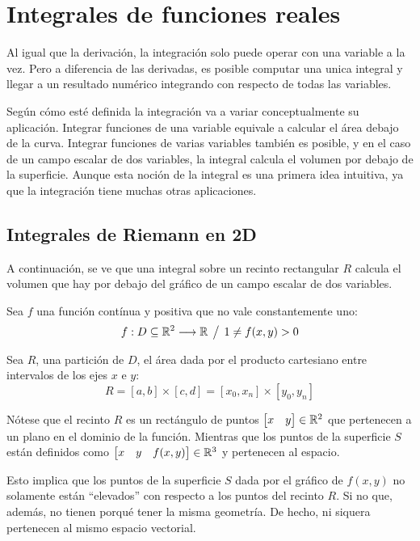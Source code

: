 \chapter{Integrales de funciones reales}

Al igual que la derivación, la integración solo puede operar con una variable a la vez.
Pero a diferencia de las derivadas, es posible computar una unica integral y llegar a un resultado numérico integrando con respecto de todas las variables.

Según cómo esté definida la integración va a variar conceptualmente su aplicación.
Integrar funciones de una variable equivale a calcular el área debajo de la curva.
Integrar funciones de varias variables también es posible, y en el caso de un campo escalar de dos variables, la integral calcula el volumen por debajo de la superficie.
Aunque esta noción de la integral es una primera idea intuitiva, ya que la integración tiene muchas otras aplicaciones.

\section{Integrales de Riemann en 2D}

A continuación, se ve que una integral sobre un recinto rectangular $R$ calcula el volumen que hay por debajo del gráfico de un campo escalar de dos variables.

Sea $f$ una función contínua y positiva que no vale constantemente uno:
\begin{equation*}
    f:D \subseteq \mathbb{R}^2 \longrightarrow \mathbb{R} \hspace{1ex} \big/ \hspace{1ex} 1 \neq f(x,y) > 0
\end{equation*}

Sea $R$, una partición de $D$, el área dada por el producto cartesiano entre intervalos de los ejes $x$ e $y$:
\begin{equation*}
    R = [a,b] \times [c,d] = [x_0,x_n] \times [y_0,y_n]
\end{equation*}

Nótese que el recinto $R$ es un rectángulo de puntos $\begin{bmatrix} x & y \end{bmatrix} \in \mathbb{R}^2$ que pertenecen a un plano en el dominio de la función.
Mientras que los puntos de la superficie $S$ están definidos como $\begin{bmatrix} x & y & f(x,y) \end{bmatrix} \in \mathbb{R}^3$ y pertenecen al espacio.

Esto implica que los puntos de la superficie $S$ dada por el gráfico de $f(x,y)$ no solamente están ``elevados'' con respecto a los puntos del recinto $R$.
Si no que, además, no tienen porqué tener la misma geometría.
De hecho, ni siquera pertenecen al mismo espacio vectorial.

